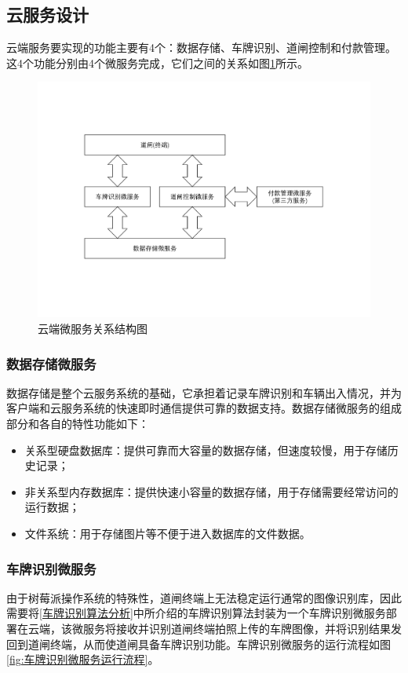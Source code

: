 \documentclass[a4paper]{ctexart}
\begin{document}
\subsection{云服务设计}\label{云服务设计}
云端服务要实现的功能主要有4个：数据存储、车牌识别、道闸控制和付款管理。这4个功能分别由4个微服务完成，它们之间的关系如图\ref{fig:云端微服务关系结构图}所示。

\begin{figure}[htbp]
	\centering
	\includegraphics[width=\textwidth]{figure/server-all.pdf}
	\caption{云端微服务关系结构图}\label{fig:云端微服务关系结构图}
\end{figure}

\subsubsection{数据存储微服务}
数据存储是整个云服务系统的基础，它承担着记录车牌识别和车辆出入情况，并为客户端和云服务系统的快速即时通信提供可靠的数据支持。数据存储微服务的组成部分和各自的特性功能如下：
\begin{itemize}
	\item 关系型硬盘数据库：提供可靠而大容量的数据存储，但速度较慢，用于存储历史记录；
	\item 非关系型内存数据库：提供快速小容量的数据存储，用于存储需要经常访问的运行数据；
	\item 文件系统：用于存储图片等不便于进入数据库的文件数据。
\end{itemize}

\subsubsection{车牌识别微服务}
由于树莓派操作系统的特殊性，道闸终端上无法稳定运行通常的图像识别库，因此需要将\ref{车牌识别算法分析}中所介绍的车牌识别算法封装为一个车牌识别微服务部署在云端，该微服务将接收并识别道闸终端拍照上传的车牌图像，并将识别结果发回到道闸终端，从而使道闸具备车牌识别功能。车牌识别微服务的运行流程如图\ref{fig:车牌识别微服务运行流程}。
\end{document}
